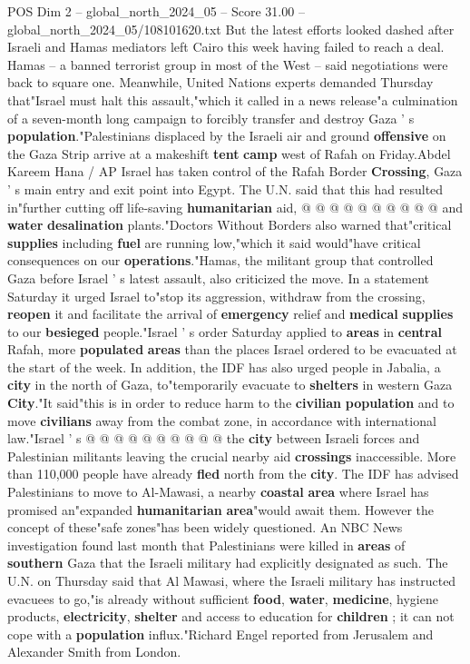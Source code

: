 \begin{textsample}{POS Dim 2 – global\_north\_2024\_05 – Score 31.00 – global\_north\_2024\_05/108101620.txt}
But the latest efforts looked dashed after Israeli and Hamas mediators left Cairo this week having failed to reach a deal.
Hamas -- a banned terrorist group in most of the West -- said negotiations were back to square one.
Meanwhile, United Nations experts demanded Thursday that"Israel must halt this assault,"which it called in a news release"a culmination of a seven-month long campaign to forcibly transfer and destroy Gaza ' s \textbf{population}."Palestinians displaced by the Israeli air and ground \textbf{offensive} on the Gaza Strip arrive at a makeshift \textbf{tent} \textbf{camp} west of Rafah on Friday.Abdel Kareem Hana / AP Israel has taken control of the Rafah Border \textbf{Crossing}, Gaza ' s main entry and exit point into Egypt.
The U.N. said that this had resulted in"further cutting off life-saving \textbf{humanitarian} aid, @ @ @ @ @ @ @ @ @ @ and \textbf{water} \textbf{desalination} plants."Doctors Without Borders also warned that"critical \textbf{supplies} including \textbf{fuel} are running low,"which it said would"have critical consequences on our \textbf{operations}."Hamas, the militant group that controlled Gaza before Israel ' s latest assault, also criticized the move.
In a statement Saturday it urged Israel to"stop its aggression, withdraw from the crossing, \textbf{reopen} it and facilitate the arrival of \textbf{emergency} relief and \textbf{medical} \textbf{supplies} to our \textbf{besieged} people."Israel ' s order Saturday applied to \textbf{areas} in \textbf{central} Rafah, more \textbf{populated} \textbf{areas} than the places Israel ordered to be evacuated at the start of the week.
In addition, the IDF has also urged people in Jabalia, a \textbf{city} in the north of Gaza, to"temporarily evacuate to \textbf{shelters} in western Gaza \textbf{City}."It said"this is in order to reduce harm to the \textbf{civilian} \textbf{population} and to move \textbf{civilians} away from the combat zone, in accordance with international law."Israel ' s @ @ @ @ @ @ @ @ @ @ the \textbf{city} between Israeli forces and Palestinian militants leaving the crucial nearby aid \textbf{crossings} inaccessible.
More than 110,000 people have already \textbf{fled} north from the \textbf{city}.
The IDF has advised Palestinians to move to Al-Mawasi, a nearby \textbf{coastal} \textbf{area} where Israel has promised an"expanded \textbf{humanitarian} \textbf{area}"would await them.
However the concept of these"safe zones"has been widely questioned.
An NBC News investigation found last month that Palestinians were killed in \textbf{areas} of \textbf{southern} Gaza that the Israeli military had explicitly designated as such.
The U.N. on Thursday said that Al Mawasi, where the Israeli military has instructed evacuees to go,"is already without sufficient \textbf{food}, \textbf{water}, \textbf{medicine}, hygiene products, \textbf{electricity}, \textbf{shelter} and access to education for \textbf{children} ; it can not cope with a \textbf{population} influx."Richard Engel reported from Jerusalem and Alexander Smith from London.


\end{textsample}
